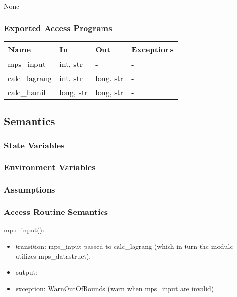 \documentclass[12pt, titlepage]{article}
\begin{document}
None

\subsubsection{Exported Access Programs}

\begin{center}
\begin{tabular}{p{2cm} p{4cm} p{4cm} p{2cm}}
\hline
\textbf{Name} & \textbf{In} & \textbf{Out} & \textbf{Exceptions} \\
\hline
mps\_input  & int, str & - & - \\
calc\_lagrang & int, str & long, str & - \\
calc\_hamil & long, str & long, str & - \\
\hline
\end{tabular}
\end{center}

\subsection{Semantics}

\subsubsection{State Variables}

\subsubsection{Environment Variables}


\subsubsection{Assumptions}


\subsubsection{Access Routine Semantics}

\noindent mps\_input():
\begin{itemize}
\item transition: mps\_input passed to calc\_lagrang (which in turn the module 
utilizes mps\_datastruct).
\item output:  
\item exception: WarnOutOfBounds (warn when mps\_input are invalid) 
\end{itemize}
\end{document}
